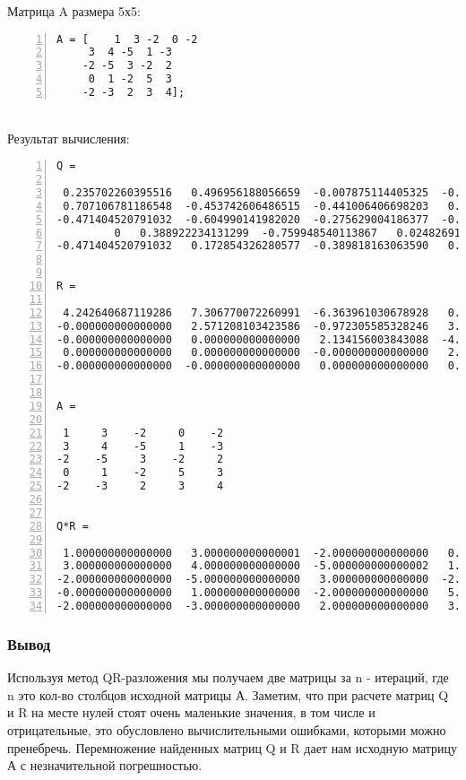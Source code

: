 \documentclass[14pt, titlepage, a4paper]{extarticle} %
\begin{document}
	Матрица A размера 5х5:
	\begin{Verbatim}[numbers=left,xleftmargin=0mm]
A = [    1  3 -2  0 -2
	 3  4 -5  1 -3
	-2 -5  3 -2  2
	 0  1 -2  5  3
	-2 -3  2  3  4];
	\end{Verbatim}
	~\\
	Результат вычисления:
	\fontsize{9pt}{12pt}\selectfont
	\begin{Verbatim}[numbers=left,xleftmargin=0mm]
Q =
	
 0.235702260395516   0.496956188056659  -0.007875114405325  -0.759703701182689   0.346795704383812
 0.707106781186548  -0.453742606486515  -0.441006406698203   0.067860243460763   0.308262848341167
-0.471404520791032  -0.604990141982020  -0.275629004186377  -0.574329377582556  -0.077065712085292
		 0   0.388922234131299  -0.759948540113867   0.024826918339304  -0.520193556575719
-0.471404520791032   0.172854326280577  -0.389818163063590   0.296267892182356   0.712857836788948
	
	
R =
	
 4.242640687119286   7.306770072260991  -6.363961030678928   0.235702260395516  -5.421151989096865
-0.000000000000000   2.571208103423586  -0.972305585328246   3.219411826975751   1.015519166898391
-0.000000000000000   0.000000000000000   2.134156003843088  -4.858945588085554  -3.051606832063456
 0.000000000000000   0.000000000000000  -0.000000000000000   2.229457266869460   1.426720240565311
-0.000000000000000  -0.000000000000000   0.000000000000000   0.000000000000000  -0.481660700533072
	
	
A =
	
 1     3    -2     0    -2
 3     4    -5     1    -3
-2    -5     3    -2     2
 0     1    -2     5     3
-2    -3     2     3     4
	
	
Q*R =
	
 1.000000000000000   3.000000000000001  -2.000000000000000   0.000000000000000  -2.000000000000000
 3.000000000000000   4.000000000000000  -5.000000000000002   1.000000000000000  -3.000000000000000
-2.000000000000000  -5.000000000000000   3.000000000000000  -2.000000000000000   2.000000000000000
-0.000000000000000   1.000000000000000  -2.000000000000000   5.000000000000001   3.000000000000000
-2.000000000000000  -3.000000000000000   2.000000000000000   3.000000000000000   4.000000000000001
	\end{Verbatim}
	\fontsize{14pt}{14pt}\selectfont

	\subsubsection*{Вывод}
	Используя метод QR-разложения мы получаем две матрицы за n - итераций, где n это кол-во столбцов исходной матрицы А.
	Заметим, что при расчете матриц Q и R на месте нулей стоят очень маленькие значения, в том числе и отрицательные, это обусловлено вычислительными ошибками, которыми можно пренебречь.
	Перемножение найденных матриц Q и R дает нам исходную матрицу А с незначительной погрешностью.
	
\end{document}
